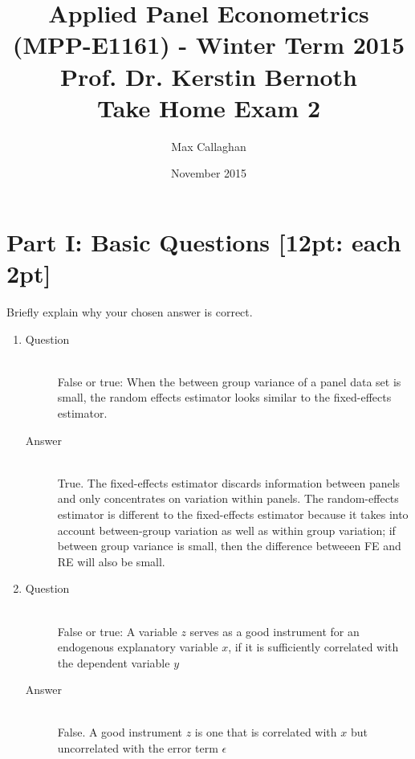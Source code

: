 \documentclass{article}
\begin{document}
\title{\small Applied Panel Econometrics (MPP-E1161) - Winter Term 2015 \\ Prof. Dr. Kerstin Bernoth \\ \bigskip \Large Take Home Exam 2}
\author{Max Callaghan}
\date{November 2015}
\maketitle

\tableofcontents

\section{Part I: Basic Questions [12pt: each 2pt]}
Briefly explain why your chosen answer is correct.
\begin{enumerate}
  \item
  \begin{description}
    \item[Question] \hfill \\
    False or true: When the between group variance of a panel data set is small, the random effects estimator looks similar to the fixed-effects estimator.
    \item[Answer] \hfill \\
    True. The fixed-effects estimator discards information between panels and only concentrates on variation within panels. The random-effects estimator is different to the fixed-effects estimator because it takes into account between-group variation as well as within group variation; if between group variance is small, then the difference betweeen FE and RE will also be small. 
    
  \end{description}
  
  \item
  \begin{description}
    \item[Question] \hfill \\
    False or true: A variable \(z\) serves as a good instrument for an endogenous explanatory variable \(x\), if it is sufficiently correlated with the dependent variable \(y\)
    \item[Answer] \hfill \\
    False. A good instrument \(z\) is one that is correlated with \(x\) but uncorrelated with the error term \(\epsilon\)
    
  \end{description}
  

\end{enumerate}
\end{document}
